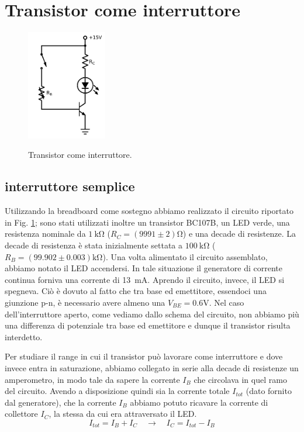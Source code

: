 \section{Transistor come interruttore}

\begin{figure}
	\caption{Transistor come interruttore.}
	\includegraphics[width=35mm]{cc1.pdf}
	\label{fig:cc1}
\end{figure}

\subsection{interruttore semplice}
Utilizzando la breadboard come sostegno abbiamo realizzato il circuito riportato in Fig. \ref{fig:cc1}; sono stati utilizzati inoltre un transistor BC107B, un LED verde, una resistenza nominale da $\SI{1}{\kilo\ohm}$ ($R_C =(9991 \pm 2) \si{\ohm}$) e una decade di resistenze. La decade di resistenza è stata inizialmente settata a $\SI{100}{\kilo\ohm}$ ($R_B = (99.902 \pm 0.003)\si{\kilo\ohm}$).
Una volta alimentato il circuito assemblato, abbiamo notato il LED accendersi. In tale situazione il generatore di corrente continua forniva una corrente di \SI{13}{\milli\ampere}. Aprendo il circuito, invece, il LED si spegneva. Ciò è dovuto al fatto che tra base ed emettitore, essendoci una giunzione p-n, è necessario avere almeno una $V_{BE}=0.6 \si{\volt}$. Nel caso dell'interruttore aperto, come vediamo dallo schema del circuito, non abbiamo più una differenza di potenziale tra base ed emettitore e dunque il transistor risulta interdetto. 

Per studiare il range in cui il transistor può lavorare come interruttore e dove invece entra in saturazione, abbiamo collegato in serie alla decade di resistenze un amperometro, in modo tale da sapere la corrente $I_B$ che circolava in quel ramo del circuito. Avendo a disposizione quindi sia la corrente totale $I_{tot}$ (dato fornito dal generatore), che la corrente $I_B$ abbiamo potuto ricavare la corrente di collettore $I_C$, la stessa da cui era attraversato il LED.
\begin{equation*}
	I_{tot} = I_B + I_C \quad \rightarrow \quad I_C = I_{tot} - I_B
\end{equation*}


